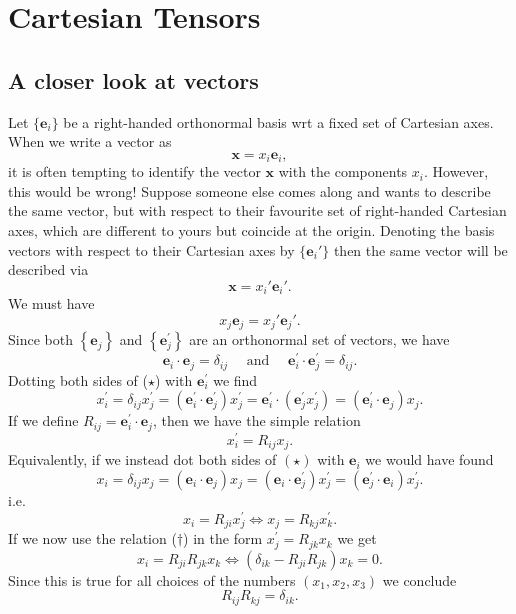 \section{Cartesian Tensors}
\subsection{A closer look at vectors}
Let $ \{\mathbf{e}_i\} $ be a right-handed orthonormal basis wrt a fixed set of Cartesian axes. When we write a vector as
\[
    \mathbf{x} = x_i\mathbf{e}_i,
\]
it is often tempting to identify the vector $ \mathbf{x} $ with the components $ x_i $. However, this would be wrong! Suppose someone else comes along and wants to describe the same vector, but with respect to their favourite set of right-handed Cartesian axes, which are different to yours but coincide at the origin. Denoting the basis vectors with respect to their Cartesian
axes by $ \{\mathbf{e}_i'\} $ then the same vector will be described via
\[
    \mathbf{x} = x_i'\mathbf{e}_i'.
\]
We must have 
\[
    x_j\mathbf{e}_j=x_j'\mathbf{e}_j'.
\]
Since both $\left\{\mathbf{e}_{j}\right\}$ and $\left\{\mathbf{e}_{j}^{\prime}\right\}$ are an orthonormal set of vectors, we have
\begin{equation}
    \mathbf{e}_{i} \cdot \mathbf{e}_{j}=\delta_{i j} \quad \text { and } \quad \mathbf{e}_{i}^{\prime} \cdot \mathbf{e}_{j}^{\prime}=\delta_{i j}.\tag{$\star$}
\end{equation}
Dotting both sides of ($\star$) with $\mathbf{e}_{i}^{\prime}$ we find
\[
x_{i}^{\prime}=\delta_{i j} x_{j}^{\prime}=\left(\mathbf{e}_{i}^{\prime} \cdot \mathbf{e}_{j}^{\prime}\right) x_{j}^{\prime}=\mathbf{e}_{i}^{\prime} \cdot\left(\mathbf{e}_{j}^{\prime} x_{j}^{\prime}\right)=\left(\mathbf{e}_{i}^{\prime} \cdot \mathbf{e}_{j}\right) x_{j}.
\]
If we define $R_{i j}=\mathbf{e}_{i}^{\prime} \cdot \mathbf{e}_{j}$, then we have the simple relation
\begin{equation}
    x_{i}^{\prime}=R_{i j} x_{j}.\tag{$\dagger$}
\end{equation}
Equivalently, if we instead dot both sides of $(\star)$ with $\mathbf{e}_{i}$ we would have found
\[
x_{i}=\delta_{i j} x_{j}=\left(\mathbf{e}_{i} \cdot \mathbf{e}_{j}\right) x_{j}=\left(\mathbf{e}_{i} \cdot \mathbf{e}_{j}^{\prime}\right) x_{j}^{\prime}=\left(\mathbf{e}_{j}^{\prime} \cdot \mathbf{e}_{i}\right) x_{j}^{\prime}.
\]
i.e.
\[
x_{i}=R_{j i} x_{j}^{\prime} \Longleftrightarrow x_{j}=R_{k j} x_{k}^{\prime}.
\]
If we now use the relation ($\dagger$) in the form $x_{j}^{\prime}=R_{j k} x_{k}$ we get
\[
x_{i}=R_{j i} R_{j k} x_{k} \Longleftrightarrow \left(\delta_{i k}-R_{j i} R_{j k}\right) x_{k}=0.
\]
Since this is true for all choices of the numbers $\left(x_{1}, x_{2}, x_{3}\right)$ we conclude
\[
R_{i j} R_{k j}=\delta_{i k}.
\]

